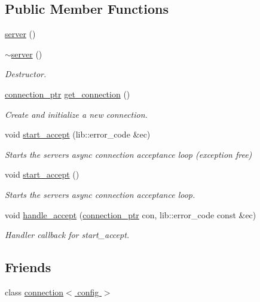 \subsection*{Public Member Functions}
\begin{DoxyCompactItemize}
\item 
\hyperlink{classwebsocketpp_1_1server_ae6ed4fd23f86c3079277ff70b9fe2e52}{server} ()
\item 
\hyperlink{classwebsocketpp_1_1server_aa9f0c40951f9a365e23233551fbc3f6b}{$\sim$server} ()
\begin{DoxyCompactList}\small\item\em Destructor. \end{DoxyCompactList}\item 
\hyperlink{classwebsocketpp_1_1server_a0b93f09ceae3d1dafd2f7b1da759c2ad}{connection\+\_\+ptr} \hyperlink{classwebsocketpp_1_1server_a9146c63ed1afb5bdec29eca52c487226}{get\+\_\+connection} ()
\begin{DoxyCompactList}\small\item\em Create and initialize a new connection. \end{DoxyCompactList}\item 
void \hyperlink{classwebsocketpp_1_1server_a0204a7d444144f7ea5b8bbcf14689fc1}{start\+\_\+accept} (lib\+::error\+\_\+code \&ec)
\begin{DoxyCompactList}\small\item\em Starts the server\textquotesingle{}s async connection acceptance loop (exception free) \end{DoxyCompactList}\item 
void \hyperlink{classwebsocketpp_1_1server_ab61bcdf9fd532fe7ebd934f8d84fdfea}{start\+\_\+accept} ()
\begin{DoxyCompactList}\small\item\em Starts the server\textquotesingle{}s async connection acceptance loop. \end{DoxyCompactList}\item 
void \hyperlink{classwebsocketpp_1_1server_aa24feb1c5d2bde47de8b11f5369c54d4}{handle\+\_\+accept} (\hyperlink{classwebsocketpp_1_1server_a0b93f09ceae3d1dafd2f7b1da759c2ad}{connection\+\_\+ptr} con, lib\+::error\+\_\+code const \&ec)
\begin{DoxyCompactList}\small\item\em Handler callback for start\+\_\+accept. \end{DoxyCompactList}\end{DoxyCompactItemize}
\subsection*{Friends}
\begin{DoxyCompactItemize}
\item 
class \hyperlink{classwebsocketpp_1_1server_a408f6796a357de56c73c3beb2f13c61d}{connection$<$ config $>$}
\end{DoxyCompactItemize}
